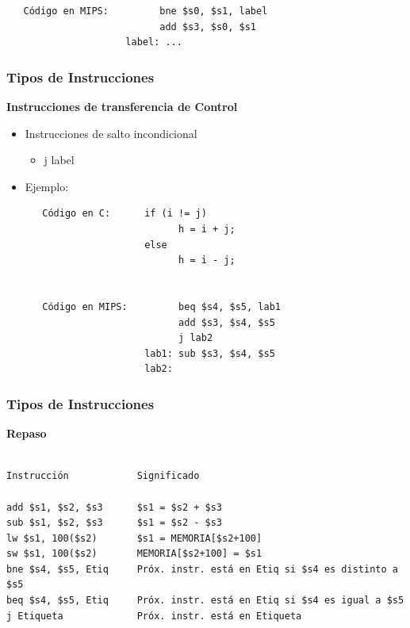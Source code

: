 \documentclass[aspectratio=169,compress]{beamer}
\begin{document}
\begin{footnotesize}
\begin{frame}[fragile]
\begin{itemize}
\begin{verbatim}
   Código en MIPS:         bne $s0, $s1, label
                           add $s3, $s0, $s1
                     label: ...
\end{verbatim}
\end{itemize}
\end{frame}




\begin{frame}[fragile]
\frametitle{Tipos de Instrucciones}
\begin{center}\textbf{Instrucciones de transferencia de Control}\end{center}

\begin{itemize}
\item Instrucciones de salto incondicional
\begin{itemize}
\item j  label
\end{itemize}
\item Ejemplo:
\begin{verbatim}
   Código en C:      if (i != j)  
                           h = i + j;
                     else
                           h = i - j;


   Código en MIPS:         beq $s4, $s5, lab1
                           add $s3, $s4, $s5
                           j lab2
                     lab1: sub $s3, $s4, $s5
                     lab2:
\end{verbatim}
\end{itemize}
\end{frame}




\begin{frame}[fragile]
\frametitle{Tipos de Instrucciones}
\begin{center}\textbf{Repaso}\end{center}

\footnotesize
\begin{verbatim}

Instrucción            Significado

add $s1, $s2, $s3      $s1 = $s2 + $s3
sub $s1, $s2, $s3      $s1 = $s2 - $s3
lw $s1, 100($s2)       $s1 = MEMORIA[$s2+100]
sw $s1, 100($s2)       MEMORIA[$s2+100] = $s1
bne $s4, $s5, Etiq     Próx. instr. está en Etiq si $s4 es distinto a $s5
beq $s4, $s5, Etiq     Próx. instr. está en Etiq si $s4 es igual a $s5
j Etiqueta             Próx. instr. está en Etiqueta

\end{verbatim}
\end{frame}



\end{footnotesize}
\end{document}
